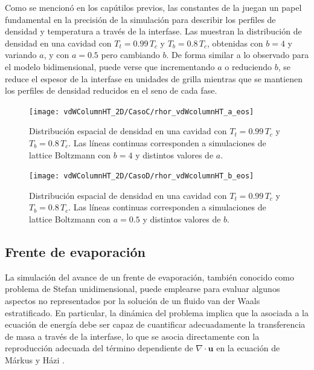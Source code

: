 Como se mencion\'o en los cap\'utilos previos, las constantes de la \eos{} juegan un papel fundamental en la precisi\'on de la simulaci\'on para describir los perfiles de densidad y temperatura a trav\'es de la interfase. Las  muestran la distribuci\'on de densidad en una cavidad con $T_t = 0.99 \, T_c$ y $T_b = 0.8 \, T_c$, obtenidas con $b=4$ y variando $a$, y con $a=0.5$ pero cambiando $b$. De forma similar a lo observado para el modelo bidimensional, puede verse que incrementando $a$ o reduciendo $b$, se reduce el espesor de la interfase en unidades de grilla mientras que se mantienen los perfiles de densidad reducidos en el seno de cada fase.

\begin{figure}[ht]
	\centering
	\texttt{[image: vdWColumnHT\_2D/CasoC/rhor\_vdWcolumnHT\_a\_eos]}
	\caption{Distribuci\'on espacial de densidad en una cavidad con $T_t = 0.99 \, T_c$ y $T_b = 0.8 \, T_c$. Las l\'ineas continuas corresponden a simulaciones de lattice Boltzmann con $b=4$ y distintos valores de $a$.}
	\label{fig:vdWColumnHT_rhor_a_eos_3D}
\end{figure}

\begin{figure}[ht]
	\centering
	\texttt{[image: vdWColumnHT\_2D/CasoD/rhor\_vdWcolumnHT\_b\_eos]}
	\caption{Distribuci\'on espacial de densidad en una cavidad con $T_t = 0.99 \, T_c$ y $T_b = 0.8 \, T_c$. Las l\'ineas continuas corresponden a simulaciones de lattice Boltzmann con $a=0.5$ y distintos valores de $b$.}
	\label{fig:vdWColumnHT_rhor_b_eos_3D}
\end{figure}
\FloatBarrier




\subsection{Frente de evaporaci\'on}

La simulaci\'on del avance de un frente de evaporaci\'on, tambi\'en conocido como problema de Stefan unidimensional, puede emplearse para evaluar algunos aspectos no representados por la soluci\'on de un fluido van der Waals estratificado. En particular, la din\'amica del problema implica que la \lbe{} asociada a la ecuaci\'on de energ\'ia debe ser capaz de cuantificar adecuadamente la transferencia de masa a trav\'es de la interfase, lo que se asocia directamente con la reproducci\'on adecuada del t\'ermino dependiente de $\nabla \cdot \bm{u}$ en la ecuaci\'on de M\'arkus y H\'azi \cite{safari_consistent_2014}.

